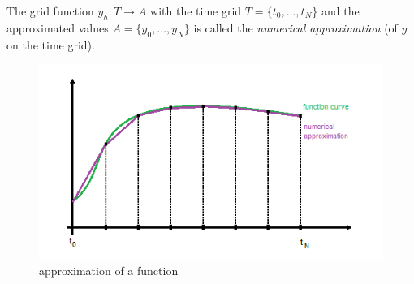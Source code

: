The grid function $y_h : T \to A$ with the time grid $T=\{t_0, ..., t_N\}$ and the approximated values $A = \{y_0, ..., y_N\}$ is called the \emph{numerical approximation} (of $y$ on the time grid).
\begin{figure}[H]
	\centering
	\includegraphics[scale=0.7]{pictures/num_approx.png}
	\caption{approximation of a function}
	\label{fig:numerical approximation}
\end{figure}

